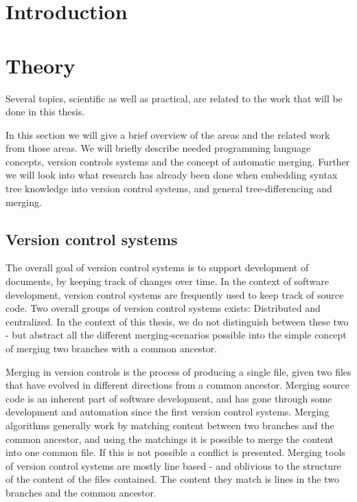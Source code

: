 \documentclass[11pt]{article}
\author{Kasper Videbæk}
\date{\today}
\begin{document}
\maketitle
\tableofcontents

\clearpage 
\section{Introduction}

\clearpage 
\section{Theory}
Several topics, scientific as well as practical, are related to the work that will be done in this thesis.

In this section we will give a brief overview of the areas and the related work from those areas. We will briefly describe needed programming language concepts, version controls systems and the concept of automatic merging. Further we will look into what research has already been done when embedding syntax tree knowledge into version control systems, and general tree-differencing and merging.

\subsection{Version control systems}
The overall goal of version control systems is to support development of documents, by keeping track of changes over time. In the context of software development, version control systems are frequently used to keep track of source code. Two overall groups of version control systems exists: Distributed and centralized. In the context of this thesis, we do not distinguish between these two - but abstract all the different merging-scenarios possible into the simple concept of merging two branches with a common ancestor.

Merging in version controls is the process of producing a single file, given two files that have evolved in different directions from a common ancestor. Merging source code is an inherent part of software development, and has gone through some development and automation since the first version control systems. Merging algorithms generally work by matching content between two branches and the common ancestor, and using the matchings it is possible to merge the content into one common file. If this is not possible a conflict is presented. Merging tools of version control systems are mostly line based - and oblivious to the structure of the content of the files contained. The content they match is lines in the two branches and the common ancestor. 
\end{document}
